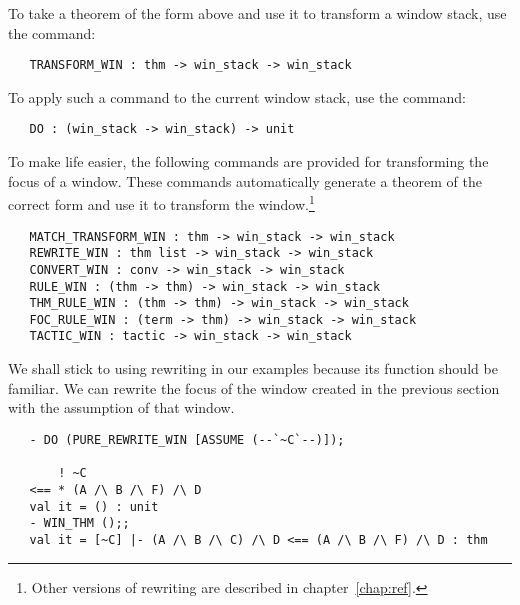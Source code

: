 To take a theorem of the form above and use it to transform a window stack,
use the command:
\begin{boxed}\begin{verbatim}
   TRANSFORM_WIN : thm -> win_stack -> win_stack
\end{verbatim}\end{boxed}
To apply such a command to the current window stack, use the  command:
\begin{boxed}\begin{verbatim}
   DO : (win_stack -> win_stack) -> unit
\end{verbatim}\end{boxed}
To make life easier,
the following commands are provided for transforming the focus of a
window.
These commands automatically generate a theorem of the correct form and
use it to transform the window.\footnote{Other versions of rewriting
are described in chapter~\ref{chap:ref}.}
\begin{boxed}\begin{verbatim}
   MATCH_TRANSFORM_WIN : thm -> win_stack -> win_stack
   REWRITE_WIN : thm list -> win_stack -> win_stack
   CONVERT_WIN : conv -> win_stack -> win_stack
   RULE_WIN : (thm -> thm) -> win_stack -> win_stack
   THM_RULE_WIN : (thm -> thm) -> win_stack -> win_stack
   FOC_RULE_WIN : (term -> thm) -> win_stack -> win_stack
   TACTIC_WIN : tactic -> win_stack -> win_stack
\end{verbatim}\end{boxed}
We shall stick to using rewriting in our examples because its function should
be familiar.
We can rewrite the focus of the window created in the
previous section with the assumption of that window.
\begin{session}\begin{verbatim}
   - DO (PURE_REWRITE_WIN [ASSUME (--`~C`--)]);
   
       ! ~C
   <== * (A /\ B /\ F) /\ D
   val it = () : unit
   - WIN_THM ();;
   val it = [~C] |- (A /\ B /\ C) /\ D <== (A /\ B /\ F) /\ D : thm
\end{verbatim}\end{session}

